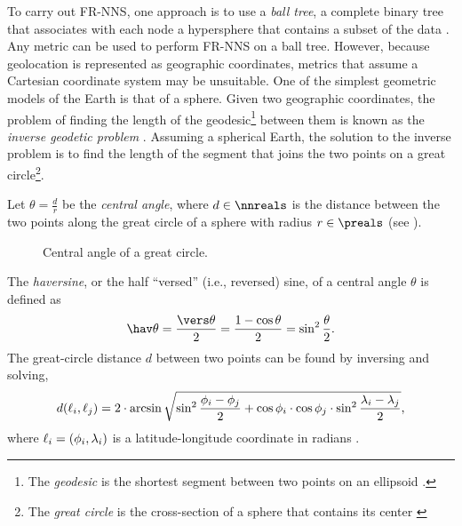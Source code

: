 To carry out FR\hyp{}NNS, one approach is to use a \emph{ball tree}, a complete binary tree that associates with each node a hypersphere that contains a subset of the data \cite{Omohundro1989, Neeraj2008, Kibriya2007}. Any metric can be used to perform FR\hyp{}NNS on a ball tree. However, because geolocation is represented as geographic coordinates, metrics that assume a Cartesian coordinate system may be unsuitable. One of the simplest geometric models of the Earth is that of a sphere. Given two geographic coordinates, the problem of finding the length of the geodesic\footnote{The \emph{geodesic} is the shortest segment between two points on an ellipsoid \cite[p. 204]{Lu2014}.} between them is known as the \emph{inverse geodetic problem} \cite{Sjoberg2012}. Assuming a spherical Earth, the solution to the inverse problem is to find the length of the segment that joins the two points on a great circle\footnote{The \emph{great circle} is the cross\hyp{}section of a sphere that contains its center \cite[p. 165]{Lu2014}}.

Let $\theta = \frac{d}{r}$ be the \emph{central angle}, where $d \in \nnreals$ is the distance between the two points along the great circle of a sphere with radius $r \in \preals$ (see ).
	\def\myrad{2.25cm}%
	\def\myang{60}%
	\begin{figure}[ht!]
	\centering
	\caption[Central angle of a great circle]{Central angle of a great circle.}
	\label{fig:central-angle}
	\end{figure}
The \emph{haversine}, or the half ``versed'' (i.e., reversed) sine, of a central angle $\theta$ is defined as
	\begin{equation}
		\hav \theta = \frac{\vers \theta}{2}  = \frac{1 - \cos \theta}{2}= \sin^2 \frac{\theta}{2}. \label{eq:hav}
	\end{equation}
The great\hyp{}circle distance $d$ between two points can be found by inversing  and solving,
	\begin{equation*}
		d(\ell_i, \ell_j) = 2 \cdot \arcsin \sqrt{\sin^2 \frac{\phi_i - \phi_j}{2} + \cos \phi_i \cdot \cos\phi_j \cdot \sin^2 \frac{\lambda_i - \lambda_j}{2}},
	\end{equation*}
where $\ell_i = (\phi_i, \lambda_i)$ is a latitude\hyp{}longitude coordinate in radians \cite[pp. 157--162]{Brummelen2013}.

